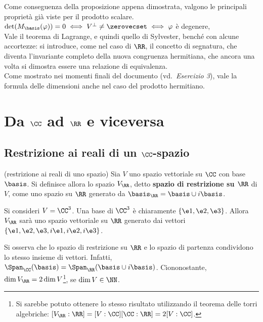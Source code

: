 \begin{remark}
	Come conseguenza della proposizione appena dimostrata, valgono
	le principali proprietà già viste per il prodotto scalare. \\
	
	\li $\det(M_\basis(\varphi)) = 0 \iff V^\perp \neq \zerovecset \iff \varphi$ è degenere, \\
	\li Vale il teorema di Lagrange, e quindi quello di Sylvester, benché con alcune accortezze: si
	introduce, come nel caso di $\RR$, il concetto di segnatura, che diventa l'invariante completo
	della nuova congruenza hermitiana, che ancora una volta si dimostra essere una relazione
	di equivalenza. \\
	\li Come mostrato nei momenti finali del documento (vd.~\textit{Esercizio 3}), vale
	la formula delle dimensioni anche nel caso del prodotto hermitiano.
\end{remark}

\section{Da $\CC$ ad $\RR$ e viceversa}

\subsection{Restrizione ai reali di un $\CC$-spazio}

\begin{definition} (restrizione ai reali di uno spazio) Sia $V$
	uno spazio vettoriale su $\CC$ con base $\basis$. Si definisce allora lo spazio $V_\RR$, detto
	\textbf{spazio di restrizione su $\RR$} di $V$, come uno spazio su $\RR$ generato da
	$\basis_\RR = \basis \cup i \basis$. 
\end{definition}

\begin{example}
	Si consideri $V = \CC^3$. Una base di $\CC^3$ è chiaramente $\{ \e1, \e2, \e3 \}$. Allora
	$V_\RR$ sarà uno spazio vettoriale su $\RR$ generato dai vettori $\{ \e1, \e2, \e3, i\e1, i\e2, i\e3 \}$.
\end{example}

\begin{remark}
	Si osserva che lo spazio di restrizione su $\RR$ e lo spazio di partenza condividono lo stesso insieme
	di vettori. Infatti, $\Span_\CC(\basis) = \Span_\RR(\basis \cup i\basis)$. Ciononostante, $\dim V_\RR = 2 \dim V$\footnote{Si sarebbe potuto ottenere lo stesso risultato utilizzando il teorema delle torri algebriche: $[V_\RR : \RR] = [V: \CC] [\CC: \RR] = 2 [V : \CC]$.}, se $\dim V \in \NN$.
\end{remark}

